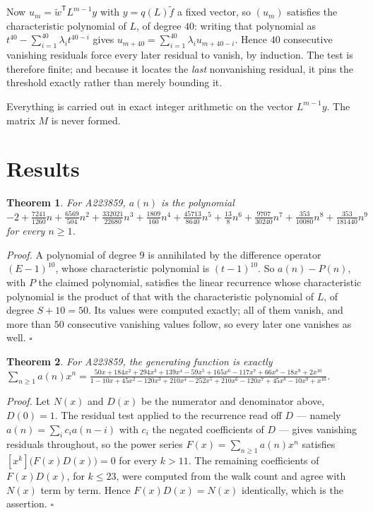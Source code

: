 \documentclass[11pt]{article}
\newtheorem{theorem}{Theorem}
\theoremstyle{definition}
\begin{document}
Now $u_m = \tilde w^{\mathsf T} L^{m-1} y$ with $y = q(L)\tilde f$ a fixed vector, so $(u_m)$ satisfies the characteristic polynomial of $L$, of degree $40$: writing that polynomial as $t^{40} - \sum_{i=1}^{40} \lambda_i t^{40-i}$ gives $u_{m+40} = \sum_{i=1}^{40} \lambda_i u_{m+40-i}$. Hence $40$ consecutive vanishing residuals force every later residual to vanish, by induction. The test is therefore finite; and because it locates the {\itshape last} nonvanishing residual, it pins the threshold exactly rather than merely bounding it.

Everything is carried out in exact integer arithmetic on the vector $L^{m-1}y$. The matrix $M$ is never formed.

\section{Results}

\begin{theorem} For A223859, $a(n)$ is the polynomial $-2 + \frac{7241}{1260}n + \frac{6569}{504}n^{2} + \frac{332021}{22680}n^{3} + \frac{1809}{160}n^{4} + \frac{45713}{8640}n^{5} + \frac{13}{8}n^{6} + \frac{9707}{30240}n^{7} + \frac{353}{10080}n^{8} + \frac{353}{181440}n^{9}$ for every $n \ge 1$.\end{theorem}

{\itshape Proof.} A polynomial of degree $9$ is annihilated by the difference operator $(E-1)^{10}$, whose characteristic polynomial is $(t-1)^{10}$. So $a(n) - P(n)$, with $P$ the claimed polynomial, satisfies the linear recurrence whose characteristic polynomial is the product of that with the characteristic polynomial of $L$, of degree $S + 10 = 50$. Its values were computed exactly; all of them vanish, and more than $50$ consecutive vanishing values follow, so every later one vanishes as well. $\square$

\begin{theorem} For A223859, the generating function is exactly $\sum_{n\ge 1} a(n)x^n = \frac{50x + 184x^{2} + 294x^{3} + 139x^{4} - 59x^{5} + 165x^{6} - 117x^{7} + 66x^{8} - 18x^{9} + 2x^{10}}{1 - 10x + 45x^{2} - 120x^{3} + 210x^{4} - 252x^{5} + 210x^{6} - 120x^{7} + 45x^{8} - 10x^{9} + x^{10}}$.\end{theorem}

{\itshape Proof.} Let $N(x)$ and $D(x)$ be the numerator and denominator above, $D(0)=1$. The residual test applied to the recurrence read off $D$ --- namely $a(n) = \sum_i c_i a(n-i)$ with $c_i$ the negated coefficients of $D$ --- gives vanishing residuals throughout, so the power series $F(x)=\sum_{n\ge 1}a(n)x^n$ satisfies $[x^k]\bigl(F(x)D(x)\bigr) = 0$ for every $k > 11$. The remaining coefficients of $F(x)D(x)$, for $k \le 23$, were computed from the walk count and agree with $N(x)$ term by term. Hence $F(x)D(x) = N(x)$ identically, which is the assertion. $\square$
\end{document}
